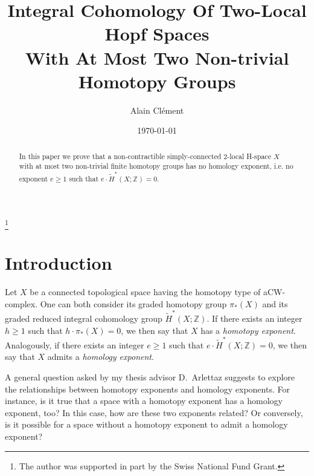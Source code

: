 \documentclass{amsart}
\theoremstyle{definition}
\theoremstyle{remark}
\newcommand{\Z}{\mathbb{Z}}
\renewcommand{\geq}{\geqslant}
\begin{document}
\title{Integral Cohomology Of Two-Local Hopf Spaces\\ With At Most Two Non-trivial Homotopy Groups}

\author{Alain Cl\'ement}
\address{Institute of Mathematics, University of Lausanne, Switzerland}
\thanks{The author was supported in part by the Swiss National Fund Grant.}

\date{\today}



\begin{abstract}
In this paper we prove that a non-contractible simply-connected $2$-local H-space $X$ with at most two non-trivial finite homotopy groups has no homology exponent, i.e. no exponent $e\geq1$ such that $e\cdot\widetilde{H}^*(X;\Z)=0$.
\end{abstract}

\maketitle


\section{Introduction}

Let $X$ be a connected topological space having the homotopy type of a\break CW-complex. One can both consider its graded homotopy group $\pi_*(X)$ and its graded reduced integral cohomology group $\widetilde{H}^*(X;\Z)$. If there exists an integer $h\geq1$ such that $h\cdot\pi_*(X)=0$, we then say that $X$ has a {\it homotopy exponent}. Analogously, if there exists an integer $e\geq1$ such that $e\cdot \widetilde{H}^*(X;\Z)=0$, we then say that $X$ admits a {\it homology exponent}.

A general question asked by my thesis advisor D.~Arlettaz suggests to explore the relationships between homotopy exponents and homology exponents. For instance, is it true that a space with a homotopy exponent has a homology exponent, too? In this case, how are these two exponents related? Or conversely, is it possible for a space without a homotopy exponent to admit a homology exponent?
\end{document}
